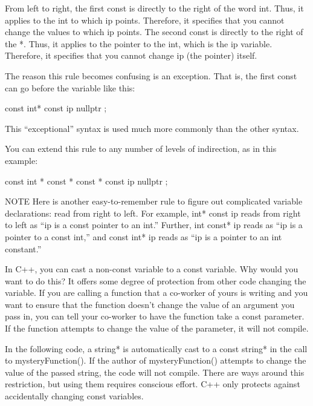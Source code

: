From left to right, the first const is directly to the right of the word int. Thus, it applies to the int to which ip points. Therefore, it specifies that you cannot change the values to which ip points. The second const is directly to the right of the *. Thus, it applies to the pointer to the int, which is the ip variable. Therefore, it specifies that you cannot change ip (the pointer) itself.

The reason this rule becomes confusing is an exception. That is, the first const can go before the variable like this:

\begin{cpp}
const int* const ip { nullptr };
\end{cpp}

This “exceptional” syntax is used much more commonly than the other syntax.

You can extend this rule to any number of levels of indirection, as in this example:

\begin{cpp}
const int * const * const * const ip { nullptr };
\end{cpp}

\begin{myNotic}{NOTE}
Here is another easy-to-remember rule to figure out complicated variable declarations: read from right to left. For example, int* const ip reads from right to left as “ip is a const pointer to an int.” Further, int const* ip reads as “ip is a pointer to a const int,” and const int* ip reads as “ip is a pointer to an int constant.”
\end{myNotic}


In C++, you can cast a non-const variable to a const variable. Why would you want to do this? It offers some degree of protection from other code changing the variable. If you are calling a function that a co-worker of yours is writing and you want to ensure that the function doesn’t change the value of an argument you pass in, you can tell your co-worker to have the function take a const parameter. If the function attempts to change the value of the parameter, it will not compile.

In the following code, a string* is automatically cast to a const string* in the call to mysteryFunction(). If the author of mysteryFunction() attempts to change the value of the passed string, the code will not compile. There are ways around this restriction, but using them requires conscious effort. C++ only protects against accidentally changing const variables.


